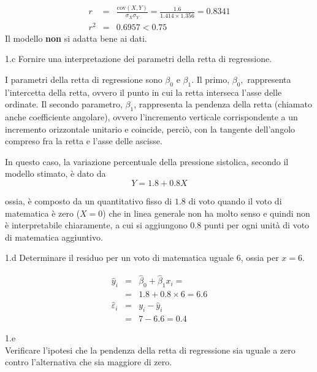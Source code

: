 \documentclass[
  11pt,
]{book}
\theoremstyle{mytheoremstyle}
\theoremstyle{mydefstyle}
\newenvironment{sol}
  {
  \begin{tcolorbox}[enhanced,breakable,arc=0.1mm,boxrule=1pt,colback=white,colframe=iblue,
  title=\bf \fontfamily{lmss}\selectfont \hspace{.5 cm} Soluzione,drop fuzzy shadow]

}{
\end{tcolorbox}
  }
\begin{document}
\begin{sol}
\begin{eqnarray*}
r&=&\frac{\text{cov}(X,Y)}{\sigma_X\sigma_Y}=\frac{ 1.6 }{ 1.414 \times 1.356 }= 0.8341 \\r^2&=& 0.6957 < 0.75
\end{eqnarray*}
Il modello \textbf{non} si adatta bene ai dati.

\end{sol}

1.c Fornire una interpretazione dei parametri della retta di regressione.

\begin{sol}
I parametri della retta di regressione sono \(\beta_{0}\) e \(\beta_{1}\).
Il primo, \(\beta_{0},\) rappresenta l'intercetta della retta,
ovvero il punto in cui la retta interseca l'asse delle ordinate.
Il secondo parametro, \(\beta_{1}\), rappresenta la pendenza della
retta (chiamato anche coefficiente angolare), ovvero l'incremento
verticale corrispondente a un incremento orizzontale unitario e
coincide, perciò, con la tangente dell'angolo compreso fra la
retta e l'asse delle ascisse.

In questo caso, la variazione percentuale della pressione sistolica,
secondo il modello stimato, è dato da
\[Y= 1.8 + 0.8 X\]

ossia, è composto da un quantitativo fisso di \(1.8\) di voto
quando il voto di matematica è zero (\(X=0\)) che in linea
generale non ha molto senso e quindi non è interpretabile
chiaramente, a cui si aggiungono \(0.8\) punti per ogni unità
di voto di matematica aggiuntivo.

\end{sol}

1.d Determinare il residuo per un voto di matematica
uguale 6, ossia per \(x=6\).

\begin{sol}
\begin{eqnarray*}
\hat y_i &=&\hat\beta_0+\hat\beta_1 x_i=\\ 
&=& 1.8 + 0.8 \times 6 = 6.6 \\ 
\hat \varepsilon_i &=& y_i-\hat y_i\\ 
&=& 7 - 6.6 = 0.4  
\end{eqnarray*}

\end{sol}

1.e\\
Verificare
l'ipotesi che la pendenza della retta di regressione sia uguale a
zero contro l'alternativa che sia maggiore di zero.
\end{document}
